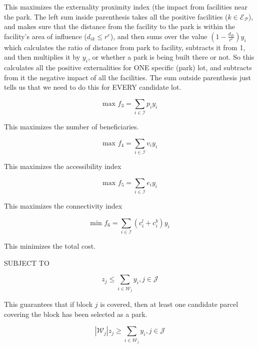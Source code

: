 \documentclass{article}
\begin{document}
This maximizes the externality proximity index (the impact from facilities near the park. 
The left sum inside parenthesis takes all the positive facilities ($k \in \mathcal{E_P}$), and makes sure that the distance from the facility to the park is within the facility's area of influence ($d_{ik} \leq r^e$), and then sums over the value $\left( 1 - \frac{d_{ik}}{r^e} \right)y_i$ which calculates the ratio of distance from park to facility, subtracts it from 1, and then multiplies it by $y_i$, or whether a park is being built there or not. So this calculates all the positive externalities for ONE specific (park) lot, and subtracts from it the negative impact of all the facilities. The sum outside parenthesis just tells us that we need to do this for EVERY candidate lot.

\begin{equation}
\textrm{max } f_3 = \sum_{i \in \mathcal{I}} p_iy_i
\end{equation}

This maximizes the number of beneficiaries. 

\begin{equation}
\textrm{max } f_4 = \sum_{i \in \mathcal{I}} v_iy_i
\end{equation}

This maximizes the accessibility index

\begin{equation}
\textrm{max } f_5 = \sum_{i \in \mathcal{I}} e_iy_i
\end{equation}

This maximizes the connectivity index

\begin{equation}
\textrm{min } f_6 = \sum_{i \in \mathcal{I}} (c_i^l + c_i^b)y_i
\end{equation}

This minimizes the total cost. \newline

{\large SUBJECT TO} \newline

\begin{equation}
z_j \leq \sum_{i \in \mathcal{W}_j} y_i, j \in \mathcal{J}
\end{equation}

This guarantees that if block $j$ is covered, then at least one candidate parcel covering the block has been selected as a park.

\begin{equation}
\left|\mathcal{W}_j\right|z_j \geq \sum_{i \in \mathcal{W}_j} y_i, j \in \mathcal{J}
\end{equation}
\end{document}

